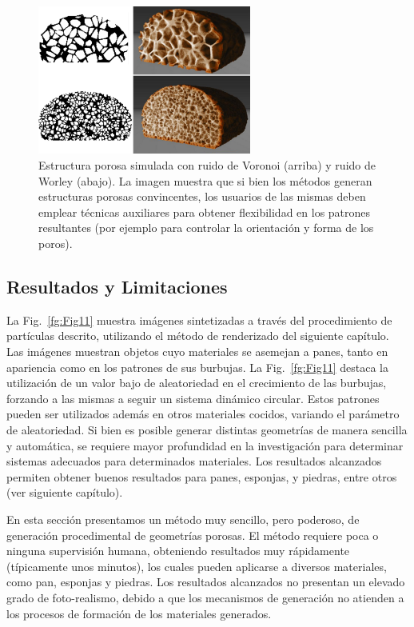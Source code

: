 \begin{figure}
  \centerline{\includegraphics[width=7cm]{figures/Fig9CAVW}}
  \caption[Estructura porosa simulada con ruido de Voronoi y ruido de Worley]{Estructura porosa simulada con ruido de Voronoi (arriba) y ruido de Worley (abajo). La imagen muestra que si bien los métodos generan estructuras porosas convincentes, los usuarios de las mismas deben emplear técnicas auxiliares para obtener flexibilidad en los patrones resultantes (por ejemplo para controlar la orientación y forma de los poros).}
  \label{fg:Fig9}
\end{figure}

\subsection{Resultados y Limitaciones}
La Fig.~\ref{fg:Fig11} muestra imágenes sintetizadas a través del procedimiento de partículas descrito, utilizando el método de renderizado del siguiente capítulo.
Las imágenes muestran objetos cuyo materiales se asemejan a panes, tanto en apariencia como en los patrones de sus burbujas.
La Fig.~\ref{fg:Fig11} destaca la utilización de un valor bajo de aleatoriedad en el crecimiento de las burbujas, forzando a las mismas a seguir un sistema dinámico circular.
Estos patrones pueden ser utilizados adem\'as en otros materiales cocidos, variando el par\'ametro de aleatoriedad.
Si bien es posible generar distintas geometrías de manera sencilla y automática, se requiere mayor profundidad en la investigación para determinar sistemas adecuados para determinados materiales.
Los resultados alcanzados permiten obtener buenos resultados para panes, esponjas, y piedras, entre otros (ver siguiente capítulo).

En esta sección presentamos un método muy sencillo, pero poderoso, de generación procedimental de geometrías porosas.
El método requiere poca o ninguna supervisión humana, obteniendo resultados muy rápidamente (típicamente unos minutos), los cuales pueden aplicarse a diversos materiales, como pan, esponjas y piedras.
Los resultados alcanzados no presentan un elevado grado de foto-realismo, debido a que los mecanismos de generación no atienden a los procesos de formación de los materiales generados.

